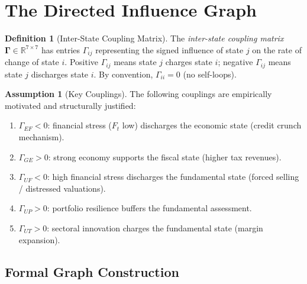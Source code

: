 \documentclass[12pt,openany]{book}
\newcommand{\bfGamma}{\boldsymbol{\Gamma}}
\newcommand{\calE}{\mathcal{E}}
\newcommand{\calF}{\mathcal{F}}
\newcommand{\calG}{\mathcal{G}}
\newcommand{\calP}{\mathcal{P}}
\newcommand{\calU}{\mathcal{U}}
\newcommand{\calT}{\mathcal{T}}
\numberwithin{equation}{chapter}
\theoremstyle{plain}
\theoremstyle{definition}
\newtheorem{definition}[theorem]{Definition}
\newtheorem{assumption}[theorem]{Assumption}
\theoremstyle{remark}
\def\mathcal#1{#1}%
\begin{document}
\section{The Directed Influence Graph}

\begin{definition}[Inter-State Coupling Matrix]
\label{def:coupling-formal}
The \emph{inter-state coupling matrix} $\bfGamma \in \mathbb{R}^{7 \times 7}$
has entries $\Gamma_{ij}$ representing the signed influence of state $j$
on the rate of change of state $i$.  Positive $\Gamma_{ij}$ means state
$j$ charges state $i$; negative $\Gamma_{ij}$ means state $j$ discharges
state $i$.  By convention, $\Gamma_{ii} = 0$ (no self-loops).
\end{definition}

\begin{assumption}[Key Couplings]
\label{asm:key-couplings}
The following couplings are empirically motivated and structurally
justified:
\begin{enumerate}
  \item $\Gamma_{\calE\calF} < 0$: financial stress ($\calF_t$ low)
        discharges the economic state (credit crunch mechanism).
  \item $\Gamma_{\calG\calE} > 0$: strong economy supports the
        fiscal state (higher tax revenues).
  \item $\Gamma_{\calU\calF} < 0$: high financial stress discharges
        the fundamental state (forced selling / distressed valuations).
  \item $\Gamma_{\calU\calP} > 0$: portfolio resilience buffers
        the fundamental assessment.
  \item $\Gamma_{\calU\calT} > 0$: sectoral innovation charges the
        fundamental state (margin expansion).
\end{enumerate}
\end{assumption}

\subsection{Formal Graph Construction}
\end{document}
